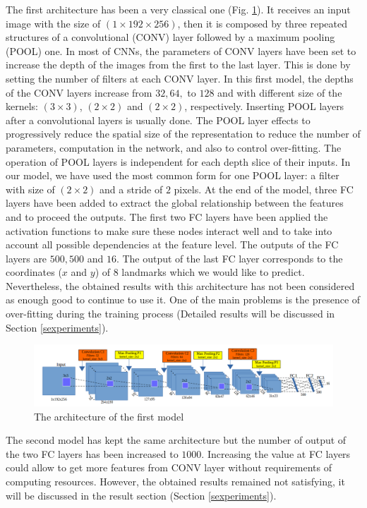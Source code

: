 \documentclass[review]{elsarticle}
\begin{document}
The first architecture has been a very classical one (Fig. \ref{fignet1}). It receives an input image with the size of $(1 \times 192 \times 256)$, then it is composed by three repeated structures of a convolutional (CONV) layer followed by a maximum pooling (POOL) one. In most of CNNs, the parameters of CONV layers have been set to increase the depth of the images from the first  to the last layer. This is done by setting the number of filters at each CONV layer. In this first model, the depths of the CONV layers increase from $32, 64, $ to $128$ and with different size of the kernels: $(3 \times 3)$, $(2 \times 2)$ and $(2 \times 2)$, respectively. Inserting POOL layers after a convolutional layers is usually done. The POOL layer effects to progressively reduce the spatial size of the representation to reduce the number of parameters, computation in the network, and also to control over-fitting. The operation of POOL layers is independent for each depth slice of their inputs. In our model, we have used the most common form for one POOL layer: a filter with size of $(2 \times 2)$ and a stride of $2$ pixels. At the end of the model, three FC layers have been added to extract the global relationship between the features and to proceed the outputs. The first two FC layers have been applied the activation functions to make sure these nodes interact well and to take into account all possible dependencies at the feature level. The outputs of the FC layers are $500, 500$ and $16$. The output of the last FC layer corresponds to the coordinates ($x$ and $y$) of $8$ landmarks which we would like to predict. Nevertheless, the obtained results with this architecture has not been considered as enough good to continue to use it. One of the main problems is the presence of over-fitting during the training process (Detailed results will be discussed in Section \ref{sexperiments}).

\begin{figure}[!h]
	\centering
	\includegraphics[scale=0.3]{images/net1}
	\caption{The architecture of the first model}
	\label{fignet1}
\end{figure}

The second model has kept the same architecture but the number of output of the two FC layers has been increased to $1000$. Increasing the value at FC layers could allow to get more features from CONV layer without requirements of computing resources. However, the obtained results remained not satisfying, it will be discussed in the result section (Section \ref{sexperiments}). 
\end{document}
